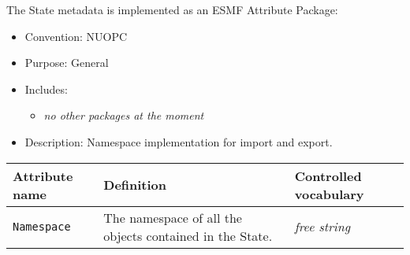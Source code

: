 \label{FieldMeta}
The State metadata is implemented as an ESMF Attribute Package:

\begin{itemize}
    \item Convention: NUOPC
    \item Purpose: General
    \item Includes:
    \begin{itemize}
        \item {\em no other packages at the moment}
    \end{itemize} 
    \item Description: Namespace implementation for import and export. 
\end{itemize}

\begin{tabular}{|p{5cm}|p{5cm}|p{35mm}|}
     \hline\hline
     {\bf Attribute name} & {\bf Definition} & {\bf Controlled vocabulary}\\
     \hline\hline
     {\tt Namespace} & The namespace of all the objects contained in the State.& {\em free string}\\ \hline
     \hline
\end{tabular}
